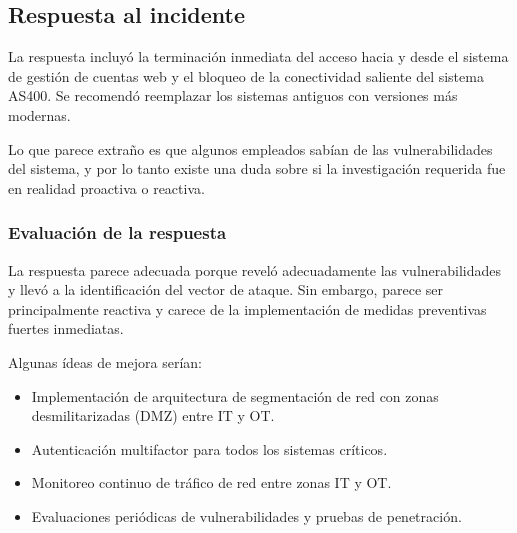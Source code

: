 \subsection{Respuesta al incidente}

La respuesta incluyó la terminación inmediata del acceso hacia y desde el sistema de gestión de cuentas web y el bloqueo de la conectividad saliente del sistema AS400. Se recomendó reemplazar los sistemas antiguos con versiones más modernas.

Lo que parece extraño es que algunos empleados sabían de las vulnerabilidades del sistema, y por lo tanto existe una duda sobre si la investigación requerida fue en realidad proactiva o reactiva.

\subsubsection{Evaluación de la respuesta}
La respuesta parece adecuada porque reveló adecuadamente las vulnerabilidades y llevó a la identificación del vector de ataque. Sin embargo, parece ser principalmente reactiva y carece de la implementación de medidas preventivas fuertes inmediatas.

Algunas ídeas de mejora serían:
\begin{itemize}
    \item Implementación de arquitectura de segmentación de red con zonas desmilitarizadas (DMZ) entre IT y OT.
    \item Autenticación multifactor para todos los sistemas críticos.
    \item Monitoreo continuo de tráfico de red entre zonas IT y OT.
    \item Evaluaciones periódicas de vulnerabilidades y pruebas de penetración.
\end{itemize}

